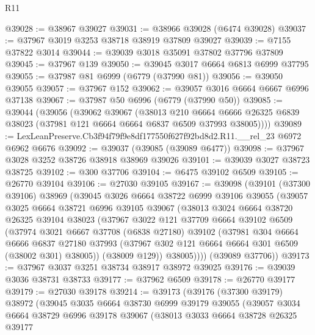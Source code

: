 \begin{lexlean}{R11}
\begin{coremodule}
@39028 := @38967 @39027
@39031 := @38966 @39028 (@6474 @39028)
@39037 := @37967 @3019 @3253 @38718 @38919 @37809 @39027
@39039 := @7155 @37822 @3014
@39044 := @39039 @3018 @35091 @37802 @37796 @37809
@39045 := @37967 @139
@39050 := @39045 @3017 @6664 @6813 @6999 @37795
@39055 := @37987 @81 @6999 (@6779 (@37990 @81))
@39056 := @39050 @39055
@39057 := @37967 @152
@39062 := @39057 @3016 @6664 @6667 @6996 @37138
@39067 := @37987 @50 @6996 (@6779 (@37990 @50))
@39085 := @39044
    (@39056
      (@39062
        @39067
        (@38013
          @210
          @6664
          @6666
          @26325
          @6839
          @38023
          (@37981 @121 @6664 @6664 @6837 @6509 @37993 @38005))))
@39089 := LexLeanPreserve.Cb3f94f79f9e8df177550f627f92bd8d2.R11.__rel_23 @6972 @6962 @6676
@39092 := @39037 (@39085 (@39089 @6477))
@39098 := @37967 @3028 @3252 @38726 @38918 @38969 @39026
@39101 := @39039 @3027 @38723 @38725
@39102 := @300 @37706
@39104 := @6475 @39102 @6509
@39105 := @26770 @39104
@39106 := @27030 @39105
@39167 := @39098
    (@39101
      (@37300 @39106)
      @38969
      (@39045
        @3026
        @6664
        @38722
        @6999
        @39106
        @39055
        (@39057
          @3025
          @6664
          @38721
          @6996
          @39105
          @39067
          (@38013
            @3024
            @6664
            @38720
            @26325
            @39104
            @38023
            (@37967
              @3022
              @121
              @37709
              @6664
              @39102
              @6509
              (@37974
                @3021
                @6667
                @37708
                (@6838 @27180)
                @39102
                (@37981
                  @304
                  @6664
                  @6666
                  @6837
                  @27180
                  @37993
                  (@37967 @302 @121 @6664 @6664 @301 @6509 (@38002 @301) @38005))
                (@38009 @129))
              @38005))))
      (@39089 @37706))
@39173 := @37967 @3037 @3251 @38734 @38917 @38972 @39025
@39176 := @39039 @3036 @38731 @38733
@39177 := @37962 @6509
@39178 := @26770 @39177
@39179 := @27030 @39178
@39214 := @39173
    (@39176
      (@37300 @39179)
      @38972
      (@39045
        @3035
        @6664
        @38730
        @6999
        @39179
        @39055
        (@39057
          @3034
          @6664
          @38729
          @6996
          @39178
          @39067
          (@38013
            @3033
            @6664
            @38728
            @26325
            @39177

\end{coremodule}
\end{lexlean}

